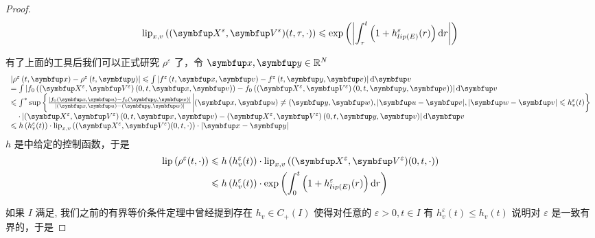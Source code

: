 \begin{proof}
\begin{equation}
    \label{eq:lip-xv-XV}
    \operatorname{lip}_{x,v}\left((\vect{X}^{\varepsilon},\vect{V}^{\varepsilon})(t, \tau, \cdot)\right) \leqslant \exp \left(\left|\int_{\tau}^{t}\left(1+h^{\varepsilon}_{lip(E)}(r)\right) \mathrm{d} r\right|\right)
\end{equation}


有了上面的工具后我们可以正式研究 $\rho^\varepsilon$ 了，令 $\vx, \vy \in \mathbb{R}^{N}$
\[
\begin{array}{l}
\left|\rho^{\varepsilon}\left(t, \vx\right)-\rho^{\varepsilon}\left(t, \vy\right)\right| \leqslant \int\left|f^{\varepsilon}\left(t, \vx, \vv\right)-f^{\varepsilon}\left(t, \vy, \vv\right)\right| \mathrm{d} \vv \\
=\int\left|f_{0}\left((\vect{X}^{\varepsilon},\vect{V}^{\varepsilon})\left(0, t, \vx, \vv\right)\right)-f_{0}\left((\vect{X}^{\varepsilon},\vect{V}^{\varepsilon})\left(0, t, \vy, \vv\right)\right)\right| \mathrm{d} \vv \\
\leqslant \int^* \sup \left\{ \frac{|f_{0}(\vx, \vect{u})-f_{0}(\vy, \vect{w})|}{|(\vx, \vect{u})-(\vy, \vect{w})|} \bigg|(\vx,\vect{u}) \neq (\vy,\vect{w}),| \vect{u}-\vv|,| \vect{w}-\vv | \leqslant h_{v}^{\varepsilon}(t)\right\} \\
\quad \cdot\left|(\vect{X}^{\varepsilon},\vect{V}^{\varepsilon})\left(0, t, \vx, \vv\right)-(\vect{X}^{\varepsilon},\vect{V}^{\varepsilon})\left(0, t, \vy, \vv\right)\right| \mathrm{d} \vv \\
\leqslant h\left(h_{v}^{\varepsilon}(t)\right) \cdot\operatorname{lip}_{x,v}\left((\vect{X}^{\varepsilon},\vect{V}^{\varepsilon})(0, t, \cdot)\right) \cdot\left|\vx-\vy\right|
\end{array}
\]
$h$ 是\lipOffVsphere 中给定的控制函数，于是
\[
\begin{aligned}
\operatorname{lip}\left(\rho^{\varepsilon}(t, \cdot)\right) & \leqslant h\left(h_{v}^{\varepsilon}(t)\right) \cdot \operatorname{lip}_{x,v}\left((\vect{X}^{\varepsilon},\vect{V}^{\varepsilon})(0, t, \cdot)\right)  \\
& \leqslant h\left(h_{v}^{\varepsilon}(t)\right) \cdot \exp \left(\int_{0}^{t}\left(1+h^{\varepsilon}_{lip(E)}(r)\right) \mathrm{d} r\right)
\end{aligned}
\]


如果 $I$ 满足\boundcondition , 我们之前的有界等价条件定理中曾经提到存在 $h_v \in C_{+}(I)$ 使得对任意的 $\varepsilon>0, t \in I$ 有 $h_{v}^{\varepsilon}(t) \leqslant h_{v}(t) $ 说明对 $\varepsilon$ 是一致有界的，于是


\end{proof}
